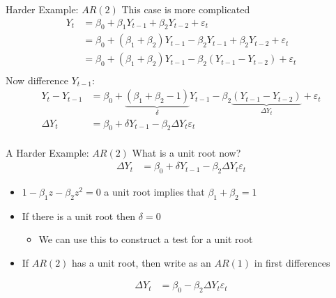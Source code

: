 \begin{frame}{Harder Example: $AR(2)$}
This case is more complicated
\begin{align*}
Y_t &= \beta_0 + \beta_1 Y_{t-1} + \beta_2 Y_{t-2} + \varepsilon_t\\
    &= \beta_0 + (\beta_1 + \beta_2) Y_{t-1} - \beta_2 Y_{t-1} +  \beta_2 Y_{t-2} + \varepsilon_t\\
    &= \beta_0 + (\beta_1 + \beta_2) Y_{t-1} - \beta_2(Y_{t-1} - Y_{t-2})+ \varepsilon_t\\
\end{align*}
Now difference $Y_{t-1}$:
\begin{align*}
Y_t -Y_{t-1}&= \beta_0 + \underbrace{(\beta_1 + \beta_2 -1)}_{\delta} Y_{t-1} - \beta_2 \underbrace{(Y_{t-1} - Y_{t-2})}_{\Delta Y_t}+ \varepsilon_t\\
\Delta Y_t &= \beta_0 + \delta Y_{t-1} - \beta_2 \Delta Y_t  \varepsilon_t\\
\end{align*}
\end{frame}



\begin{frame}{A Harder Example: $AR(2)$}
What is a unit root now?
\begin{align*}
\Delta Y_t &= \beta_0 + \delta Y_{t-1} - \beta_2 \Delta Y_t  \varepsilon_t
\end{align*}
\begin{itemize}
\item $1- \beta_1 z - \beta_2 z^2 = 0$ a unit root implies that $\beta_1 + \beta_2=1$
\item If there is a unit root then $\delta=0$
\begin{itemize}
\item We can use this to construct a test for a unit root
\end{itemize}
\item If $AR(2)$ has a unit root, then write as an $AR(1)$ in first differences
\end{itemize}
\begin{align*}
\Delta Y_t &= \beta_0 - \beta_2 \Delta Y_t  \varepsilon_t\\
\end{align*}
\end{frame}

